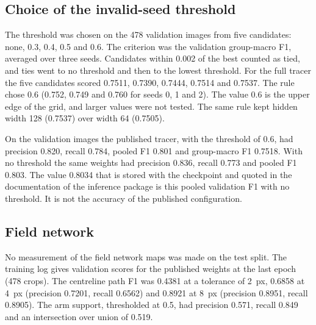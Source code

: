 \subsection*{Choice of the invalid-seed threshold}

The threshold was chosen on the 478 validation images from five candidates: none, 0.3, 0.4, 0.5 and 0.6.
The criterion was the validation group-macro F1, averaged over three seeds.
Candidates within 0.002 of the best counted as tied, and ties went to no threshold and then to the lowest threshold.
For the full tracer the five candidates scored 0.7511, 0.7390, 0.7444, 0.7514 and 0.7537.
The rule chose 0.6 (0.752, 0.749 and 0.760 for seeds 0, 1 and 2).
The value 0.6 is the upper edge of the grid, and larger values were not tested.
The same rule kept hidden width 128 (0.7537) over width 64 (0.7505).

On the validation images the published tracer, with the threshold of 0.6, had precision 0.820, recall 0.784, pooled F1 0.801 and group-macro F1 0.7518.
With no threshold the same weights had precision 0.836, recall 0.773 and pooled F1 0.803.
The value 0.8034 that is stored with the checkpoint and quoted in the documentation of the inference package is this pooled validation F1 with no threshold.
It is not the accuracy of the published configuration.

\subsection*{Field network}

No measurement of the field network maps was made on the test split.
The training log gives validation scores for the published weights at the last epoch (478 crops).
The centreline path F1 was 0.4381 at a tolerance of 2~px, 0.6858 at 4~px (precision 0.7201, recall 0.6562) and 0.8921 at 8~px (precision 0.8951, recall 0.8905).
The arm support, thresholded at 0.5, had precision 0.571, recall 0.849 and an intersection over union of 0.519.
